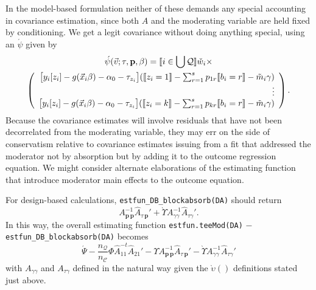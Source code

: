 \documentclass{article}
\DeclarePairedDelimiter{\indicator}{\llbracket}{\rrbracket}
\newcommand{\owt}[1][{[z_{i}]}]{\ensuremath{\check{w}_{i#1}}}
\newcommand{\AbsorbInterceptsEF}{\Upsilon}
\newcommand{\absorbModeratorEF}{\grave{\upsilon}}
\newcommand{\AbsorbModeratorEF}{\grave{\Upsilon}}
\begin{document}
In the model-based formulation neither of these demands any special
accounting in covariance estimation, since both $A$ and the moderating
variable are held fixed by conditioning. We get a legit covariance
without doing anything special, using an $\acute{\psi}$ given by
\begin{multline*}
  \acute{\psi}(\vec{v}; \tau, \mathbf{p}, \beta) =
    \indicator{i \in \bigcup \mathcal{Q}}\owt[] \times \\
\left(
  \begin{array}{r}
    \big[y_{i}[z_{i}]
    -
    g(\vec{x}_{i}\beta)-\alpha_{0}-\tau_{z_{i}}\big]
    (
    \indicator{z_{i}=1}-
    \sum_{r=1}^{s}p_{1r}\indicator{b_{i}=r}
    - \tilde{m}_{i}\gamma)\\
    \vdots \\
    {}\big[y_{i}[z_{i}]
    - g(\vec{x}_{i}\beta) -\alpha_{0} -
    \tau_{z_{i}}\big]
    (
    \indicator{z_{i}=k}
    -
    \sum_{r=1}^{s}p_{kr}\indicator{b_{i}=r}
    -
    \tilde{m}_{i}\gamma)\\
  \end{array}
\right) .
\end{multline*}
Because the covariance estimates will
involve residuals that have not been decorrelated from the moderating
variable, they may err on the side of conservatism relative to
covariance estimates issuing from a fit that addressed the moderator
not by absorption but by adding it to the outcome regression
equation. We might consider alternate elaborations of the estimating
function that introduce moderator main effects to the outcome equation.

For design-based calculations, \texttt{estfun\_DB\_blockabsorb(DA)}
 should return
 \begin{equation*}
   A_{\mathbf{p}\,\mathbf{p}}^{-1}\hat{A}_{\tau\,\mathbf{p}}' +
  \AbsorbModeratorEF{}A_{\gamma \gamma}^{-1}\hat{A}_{\tau \gamma}'.
 \end{equation*}
 In this way, the overall estimating function
 \texttt{estfun.teeMod(DA)} $-$ \texttt{estfun\_DB\_blockabsorb(DA)} 
 becomes
 \begin{equation}
   \label{eq:19}
  \acute{\Psi} -
  \frac{n_{\mathcal{Q}}}{n_{\mathcal{C}}}\Phi
  \hat{A}_{11}^{-t}\hat{A}_{21}' - \AbsorbInterceptsEF{}
  A_{\mathbf{p}\,\mathbf{p}}^{-1}\hat{A}_{\tau\,\mathbf{p}}' -
  \AbsorbModeratorEF{}A_{\gamma \gamma}^{-1}\hat{A}_{\tau \gamma}'
 \end{equation}
with $A_{\gamma \gamma}$ and $A_{\tau \gamma}$ defined in the natural
way given the $\absorbModeratorEF()$ definitions stated just above. 
\end{document}
